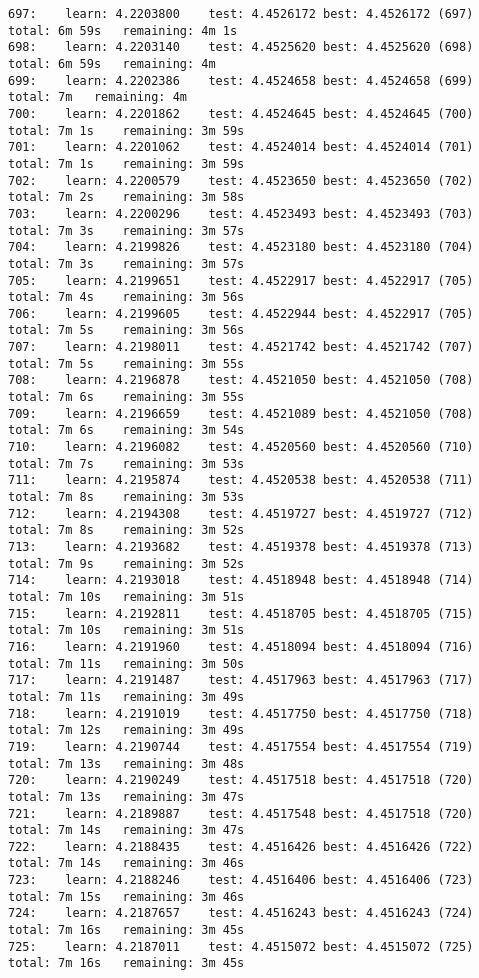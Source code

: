 \documentclass[11pt]{article}
\begin{document}
\begin{Verbatim}[commandchars=\\\{\}]
697:	learn: 4.2203800	test: 4.4526172	best: 4.4526172 (697)	total: 6m 59s	remaining: 4m 1s
698:	learn: 4.2203140	test: 4.4525620	best: 4.4525620 (698)	total: 6m 59s	remaining: 4m
699:	learn: 4.2202386	test: 4.4524658	best: 4.4524658 (699)	total: 7m	remaining: 4m
700:	learn: 4.2201862	test: 4.4524645	best: 4.4524645 (700)	total: 7m 1s	remaining: 3m 59s
701:	learn: 4.2201062	test: 4.4524014	best: 4.4524014 (701)	total: 7m 1s	remaining: 3m 59s
702:	learn: 4.2200579	test: 4.4523650	best: 4.4523650 (702)	total: 7m 2s	remaining: 3m 58s
703:	learn: 4.2200296	test: 4.4523493	best: 4.4523493 (703)	total: 7m 3s	remaining: 3m 57s
704:	learn: 4.2199826	test: 4.4523180	best: 4.4523180 (704)	total: 7m 3s	remaining: 3m 57s
705:	learn: 4.2199651	test: 4.4522917	best: 4.4522917 (705)	total: 7m 4s	remaining: 3m 56s
706:	learn: 4.2199605	test: 4.4522944	best: 4.4522917 (705)	total: 7m 5s	remaining: 3m 56s
707:	learn: 4.2198011	test: 4.4521742	best: 4.4521742 (707)	total: 7m 5s	remaining: 3m 55s
708:	learn: 4.2196878	test: 4.4521050	best: 4.4521050 (708)	total: 7m 6s	remaining: 3m 55s
709:	learn: 4.2196659	test: 4.4521089	best: 4.4521050 (708)	total: 7m 6s	remaining: 3m 54s
710:	learn: 4.2196082	test: 4.4520560	best: 4.4520560 (710)	total: 7m 7s	remaining: 3m 53s
711:	learn: 4.2195874	test: 4.4520538	best: 4.4520538 (711)	total: 7m 8s	remaining: 3m 53s
712:	learn: 4.2194308	test: 4.4519727	best: 4.4519727 (712)	total: 7m 8s	remaining: 3m 52s
713:	learn: 4.2193682	test: 4.4519378	best: 4.4519378 (713)	total: 7m 9s	remaining: 3m 52s
714:	learn: 4.2193018	test: 4.4518948	best: 4.4518948 (714)	total: 7m 10s	remaining: 3m 51s
715:	learn: 4.2192811	test: 4.4518705	best: 4.4518705 (715)	total: 7m 10s	remaining: 3m 51s
716:	learn: 4.2191960	test: 4.4518094	best: 4.4518094 (716)	total: 7m 11s	remaining: 3m 50s
717:	learn: 4.2191487	test: 4.4517963	best: 4.4517963 (717)	total: 7m 11s	remaining: 3m 49s
718:	learn: 4.2191019	test: 4.4517750	best: 4.4517750 (718)	total: 7m 12s	remaining: 3m 49s
719:	learn: 4.2190744	test: 4.4517554	best: 4.4517554 (719)	total: 7m 13s	remaining: 3m 48s
720:	learn: 4.2190249	test: 4.4517518	best: 4.4517518 (720)	total: 7m 13s	remaining: 3m 47s
721:	learn: 4.2189887	test: 4.4517548	best: 4.4517518 (720)	total: 7m 14s	remaining: 3m 47s
722:	learn: 4.2188435	test: 4.4516426	best: 4.4516426 (722)	total: 7m 14s	remaining: 3m 46s
723:	learn: 4.2188246	test: 4.4516406	best: 4.4516406 (723)	total: 7m 15s	remaining: 3m 46s
724:	learn: 4.2187657	test: 4.4516243	best: 4.4516243 (724)	total: 7m 16s	remaining: 3m 45s
725:	learn: 4.2187011	test: 4.4515072	best: 4.4515072 (725)	total: 7m 16s	remaining: 3m 45s

\end{Verbatim}
\end{document}
